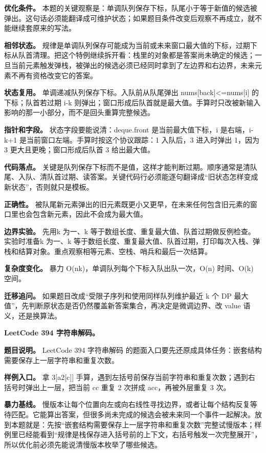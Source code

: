 \textbf{优化条件。} 本题的关键观察是：单调队列保存下标，队尾小于等于新值的候选被弹出。这句话必须能翻译成可维护状态；如果题目条件改变后观察不再成立，就不能继续套原来的写法。

\textbf{相邻状态。} 规律是单调队列保存可能成为当前或未来窗口最大值的下标，过期下标从队首清理。把这个特例继续拆开看：栈里的对象都是答案尚未确定的候选；一旦当前元素触发弹栈，被弹出的候选必须已经同时拿到了左边界和右边界，未来元素不再有资格改变它的答案。

\textbf{状态复用。} 单调递减队列保存下标。入队前从队尾弹出 nums[back]<=nums[i] 的下标；队首若过期 i-k 则弹出；窗口形成后队首就是最大值。手算时只改被新输入影响的那一小部分，而不是回头重算完整候选。

\textbf{指针和字段。} 状态字段要能说清：deque.front 是当前最大值下标，i 是右端，i-k+1 是当前窗口左端。手算时按这个协议跟踪：1 入队后，3 进入时弹出 1，因为 3 更大且更晚；窗口形成后队首 3 给出最大值。

\textbf{代码落点。} 关键是队列保存下标而不是值，这样才能判断过期。顺序通常是清队尾、入队、清队首过期、读答案。关键代码行必须能逐句翻译成“旧状态怎样变成新状态”，否则就只是模板。

\textbf{正确性。} 被队尾新元素弹出的旧元素既更小又更早，在未来任何包含旧元素的窗口里也会包含新元素，因此不会成为最大值。

\textbf{边界实验。} 先用k 为一、k 等于数组长度、重复最大值、队首过期做反例检查。实验时准备k 为一、k 等于数组长度、重复最大值、队首过期，打印每次入栈、弹栈和结算对象。重点观察相等元素、空栈、哨兵和最后一次结算。

\textbf{复杂度变化。} 暴力 O(nk)，单调队列每个下标入队出队一次，O(n) 时间、O(k) 空间。

\textbf{迁移追问。} 如果题目改成“受限子序列和使用同样队列维护最近 k 个 DP 最大值”，先判断原状态是否仍然覆盖新答案集合，再决定是微调边界、改 value 语义，还是换算法。

\noindent\textbf{LeetCode 394 字符串解码。}

\textbf{题目说明。} LeetCode 394 字符串解码 的题面入口要先还原成具体任务：嵌套结构需要保存上一层字符串和重复次数。

\textbf{样例入口。} 拿 3[a2[c]] 手算，遇到左括号前保存当前字符串和重复次数；遇到右括号时弹出上一层，把当前 cc 重复 2 次拼成 acc，再被外层重复 3 次。

\textbf{暴力基线。} 慢版本让每个位置向左或向右线性寻找边界，或者让每个结构反复等待匹配。它能算出答案，但很多尚未完成的候选会被未来同一个事件一起解决。放到本题就是：先按“嵌套结构需要保存上一层字符串和重复次数”完整试慢版本；样例里已经能看到“规律是栈保存进入括号前的上下文，右括号触发一次完整展开”，所以优化前必须先能说清慢版本枚举了哪些候选。

